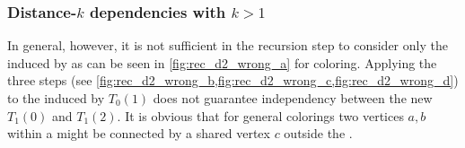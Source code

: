 	\subsubsection{Distance-$k$ dependencies with $k>1$}
In general, however, it is not sufficient in the recursion step to consider only the \subgraphs induced by \levelGroups as can be seen in \cref{fig:rec_d2_wrong_a} for \DTWO coloring. Applying  the three steps (see \cref{fig:rec_d2_wrong_b,fig:rec_d2_wrong_c,fig:rec_d2_wrong_d})  to  the \subgraph induced by $T_0(1)$ does not guarantee \DTWO independency between the new \levelGroups $T_1(0)$ and $T_1(2)$. It is obvious that for general \DK colorings two vertices $a,b$ within a \levelGroup might be connected by a shared vertex $c$ outside the \levelGroup. 
